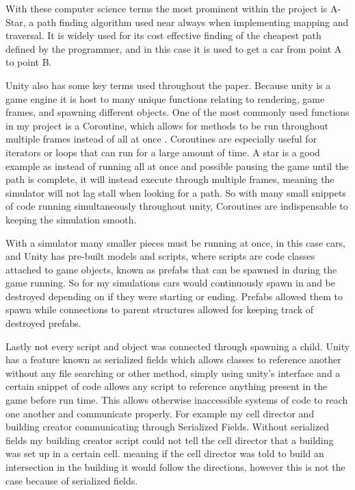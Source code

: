 \documentclass[10pt,twocolumn]{article}
\begin{document}
With these computer science terms the most prominent within the project is A-Star, a path finding algorithm used near always when implementing mapping and traversal. It is widely used for its cost effective finding of the cheapest path defined by the programmer, and in this case it is used to get a car from point A to point B. 

Unity also has some key terms used throughout the paper. Because unity is a game engine it is host to many unique functions relating to rendering, game frames, and spawning different objects. One of the most commonly used functions in my project is a Coroutine, which allows for methods to be run throughout multiple frames instead of all at once \cite{UnityManual}. Coroutines are especially useful for iterators or loops that can run for a large amount of time. A star is a good example as instead of running all at once and possible pausing the game until the path is complete, it will instead execute through multiple frames, meaning the simulator will not lag stall when looking for a path. So with many small snippets of code running simultaneously throughout unity, Coroutines are indispensable to keeping the simulation smooth. 

With a simulator many smaller pieces must be running at once, in this case cars, and Unity has pre-built models and scripts, where scripts are code classes attached to game objects, known as prefabs that can be spawned in during the game running. So for my simulations cars would continuously spawn in and be destroyed depending on if they were starting or ending. Prefabs allowed them to spawn while connections to parent structures allowed for keeping track of destroyed prefabs. 

Lastly not every script and object was connected through spawning a child. Unity has a feature known as serialized fields which allows classes to reference another without any file searching or other method, simply using unity's interface and a certain snippet of code allows any script to reference anything present in the game before run time. This allows otherwise inaccessible systems of code to reach one another and communicate properly. For example my cell director and building creator communicating through Serialized Fields. Without serialized fields my building creator script could not tell the cell director that a building was set up in a certain cell. meaning if the cell director was told to build an intersection in the building it would follow the directions, however this is not the case because of serialized fields.
\end{document}
